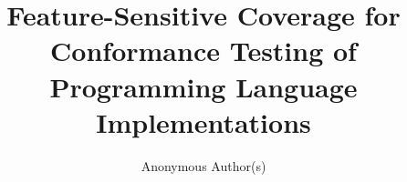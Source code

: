 \documentclass[acmsmall,screen]{acmart}
\begin{document}
\title[Feature-Sensitive Coverage for Conformance Testing]
{Feature-Sensitive Coverage for Conformance Testing of Programming Language
Implementations}

\author{Anonymous Author(s)}

%
%
%



%

\maketitle












\balance

\end{document}
